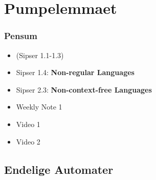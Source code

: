 \section{Pumpelemmaet}%
\label{sec:Pumpelemma}

\begin{frame}
	\frametitle{Pensum}
	\begin{itemize}
		\item (Sipser 1.1-1.3)
		\item Sipser 1.4: \textbf{Non-regular Languages}
		\item Sipser 2.3: \textbf{Non-context-free Languages}
		\item Weekly Note 1
		\item Video 1
		\item Video 2
	\end{itemize}
\end{frame}

\subsection{Endelige Automater}%
\label{subsec:endeligeautomater}

